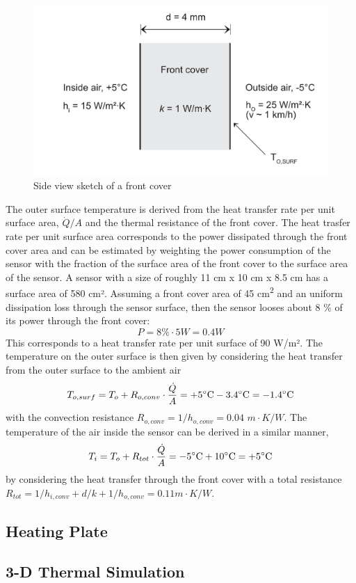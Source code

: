 \begin{figure} [H]
	\centering
	\includegraphics[scale=0.75]{Pictures/Appendix_Windshield.png}
	\caption[PassiveHeating]{Side view sketch of a front cover}
	\label{fig:fig1}
\end{figure}
The outer surface temperature is derived from the heat transfer rate per unit surface area, \(\dot{Q}/A\) and the thermal resistance of the front cover. The heat trasfer rate per unit surface area corresponds to the power dissipated through the front cover area and can be estimated by weighting the power consumption of the sensor with the fraction of the surface area of the front cover to the surface area of the sensor. A sensor with a size of roughly 11 cm x 10 cm x 8.5 cm has a surface area of 580 \unit{cm²}. Assuming a front cover area of 45 \unit{cm^2} and an uniform dissipation loss through the sensor surface, then the sensor looses about 8 \unit{\%} of its power through the front cover:
\begin{equation}
P = 8 \% \cdot 5 \unit{W} = 0.4 \unit{W}
\end{equation}
This corresponds to a heat transfer rate per unit surface of 90 \unit{W/m²}. The temperature on the outer surface is then given by considering the heat transfer from the outer surface to the ambient air
\begin{equation}
T_{o,surf} = T_{o} + R_{o,conv}\cdot \frac{\dot{Q}}{A} = +5 \dC - 3.4 \dC = -1.4 \dC
\end{equation}
with the convection resistance \(R_{o,conv} = 1/h_{o,conv} = 0.04 \,\, \unit{m\cdot K/W}\). The temperature of the air inside the sensor can be derived in a similar manner,  
\begin{equation}
T_{i} = T_{o} + R_{tot}\cdot \frac{\dot{Q}}{A} = -5 \dC + 10 \dC = +5 \dC
\end{equation}
by considering the heat transfer through the front cover with a total resistance \(R_{tot} = 1/h_{i,conv}+d/k+1/h_{o,conv} = 0.11 \unit{m\cdot K/W}\).


\subsection{Heating Plate}


\subsection{3-D Thermal Simulation}